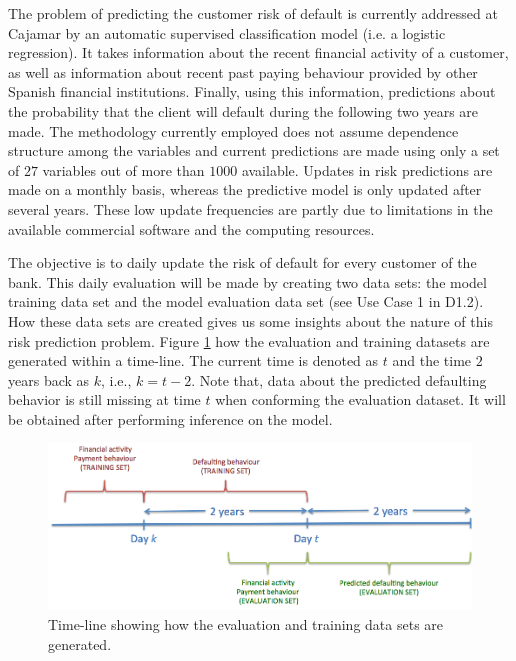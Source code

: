 The problem of predicting the customer risk of default is currently addressed at Cajamar by an automatic supervised classification model (i.e. a logistic regression). It takes information about the recent financial activity of a customer, as well as information about recent past paying behaviour provided by other Spanish financial institutions. Finally, using this information, predictions about the probability that the client will default during the following two years are made. The methodology currently employed does not assume dependence structure among the variables and current predictions are made using only a set of $27$ variables out of more than $1000$ available. Updates in risk predictions are made on a monthly basis, whereas the predictive model is only updated after several years. These low update frequencies are partly due to limitations in the available commercial software and the computing resources.

The objective is to daily update the risk of default for every customer of the bank. This daily evaluation will be made by creating two data sets: the model training data set and the model evaluation data set (see Use Case 1 in D1.2). How these data sets are created gives us some insights about the nature of this risk prediction problem.  Figure \ref{Figure:CajaMarTimeLine} how the evaluation and training datasets are generated within a time-line. The current time is denoted as $t$ and the time $2$ years back as $k$, i.e., $k=t-2$. Note that, data about the predicted defaulting behavior is still missing at time $t$ when conforming the evaluation dataset. It will be obtained after performing inference on the model.

\begin{figure}[htbp]
\centering
\includegraphics[scale=0.4]{figures/CajaMarTimeLine}
\caption{\label{Figure:CajaMarTimeLine}Time-line showing how the evaluation and training data sets are generated.}
\end{figure}

